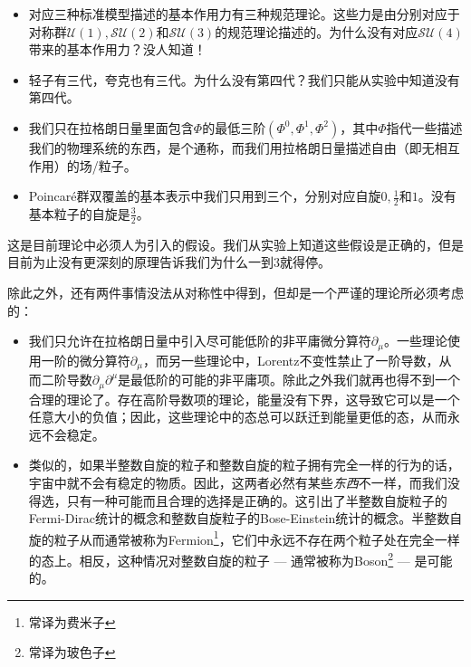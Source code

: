 \begin{itemize}
\item 对应三种标准模型描述的基本作用力有三种规范理论。这些力是由分别对应于对称群$\mathcal{U}(1), \mathcal{SU}(2)$和$\mathcal{SU}(3)$的规范理论描述的。为什么没有对应$\mathcal{SU}(4)$带来的基本作用力？没人知道！
\item 轻子有三代，夸克也有三代。为什么没有第四代？我们只能从实验中知道没有第四代。
\item 我们只在拉格朗日量里面包含$\Phi$的最低三阶$(\Phi^0, \Phi^1, \Phi^2)$，其中$\Phi$指代一些描述我们的物理系统的东西，是个通称，而我们用拉格朗日量描述自由（即无相互作用）的场/粒子。
\item Poincaré群双覆盖的基本表示中我们只用到三个，分别对应自旋$0, \tfrac{1}{2}$和$1$。没有基本粒子的自旋是$\tfrac{3}{2}$。
\end{itemize}

这是目前理论中必须人为引入的假设。我们从实验上知道这些假设是正确的，但是目前为止没有更深刻的原理告诉我们为什么一到$3$就得停。

除此之外，还有两件事情没法从对称性中得到，但却是一个严谨的理论所必须考虑的：

\begin{itemize}
\item 我们只允许在拉格朗日量中引入尽可能低阶的非平庸微分算符$\partial_\mu$。一些理论使用一阶的微分算符$\partial_\mu$，而另一些理论中，Lorentz不变性禁止了一阶导数，从而二阶导数$\partial_\mu\partial^\mu$是最低阶的可能的非平庸项。除此之外我们就再也得不到一个合理的理论了。存在高阶导数项的理论，能量没有下界，这导致它可以是一个任意大小的负值；因此，这些理论中的态总可以跃迁到能量更低的态，从而永远不会稳定。
\item 类似的，如果半整数自旋的粒子和整数自旋的粒子拥有完全一样的行为的话，宇宙中就不会有稳定的物质。因此，这两者必然有某些{\it 东西}不一样，而我们没得选，只有一种可能而且合理的选择是正确的。这引出了半整数自旋粒子的Fermi-Dirac统计的概念和整数自旋粒子的Bose-Einstein统计的概念。半整数自旋的粒子从而通常被称为Fermion\footnote{常译为费米子}，它们中永远不存在两个粒子处在完全一样的态上。相反，这种情况对整数自旋的粒子 --- 通常被称为Boson\footnote{常译为玻色子} --- 是可能的。
\end{itemize}

